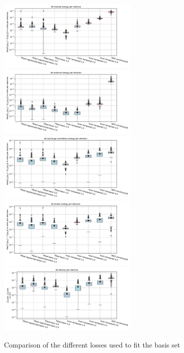 \begin{figure}
    \centering
    \includegraphics[width=0.6\textwidth]{chapters/results/results_images/AE_hartree_energy_on_hartree+external_MOFDFT_for_different_basis_sets}
    \includegraphics[width=0.6\textwidth]{chapters/results/results_images/AE_ext_energy_on_hartree+external_MOFDFT_for_different_basis_sets}
    \includegraphics[width=0.6\textwidth]{chapters/results/results_images/AE_xc_energy_on_hartree+external_MOFDFT_for_different_basis_sets}
    \includegraphics[width=0.6\textwidth]{chapters/results/results_images/AE_kin_energy_on_hartree+external_MOFDFT_for_different_basis_sets}
    \includegraphics[width=0.6\textwidth]{chapters/results/results_images/AE_density_on_hartree+external_MOFDFT_for_different_basis_sets}
    \caption{Comparison of the different losses used to fit the basis set}
\end{figure}
